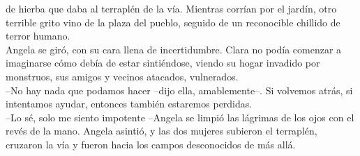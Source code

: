 de hierba que daba al terraplén de la vía. Mientras corrían por el
jardín, otro terrible grito vino de la plaza del pueblo, seguido de un
reconocible chillido de terror humano.\\
Angela se giró, con su cara llena de incertidumbre. Clara no podía
comenzar a imaginarse cómo debía de estar sintiéndose, viendo su hogar
invadido por monstruos, sus amigos y vecinos atacados, vulnerados.\\
--No hay nada que podamos hacer --dijo ella, amablemente--. Si volvemos
atrás, si intentamos ayudar, entonces también estaremos perdidas.\\
--Lo sé, solo me siento impotente --Angela se limpió las lágrimas de los
ojos con el revés de la mano. Angela asintió, y las dos mujeres subieron
el terraplén, cruzaron la vía y fueron hacia los campos desconocidos de
más allá.\\
